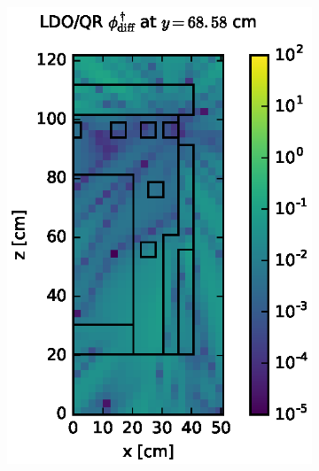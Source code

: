 \begin{figure}[!htb]
\centering
\begin{subfigure}{0.4\textwidth}
\includegraphics[max height=0.445\textheight]
{img/dlvn-plots/cad-adj/flux-diff-rel-qr04.eps}
\end{subfigure} ~
\begin{subfigure}{0.4\textwidth}

\end{subfigure}
\end{figure}
